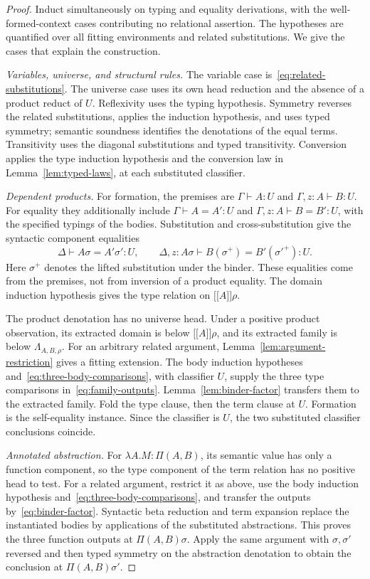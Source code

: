 \documentclass[11pt,a4paper]{article}
\theoremstyle{definition}
\theoremstyle{remark}
\newcommand{\ev}[1]{\mathopen{[\![}#1\mathclose{]\!]}}
\begin{document}
\begin{proof}
Induct simultaneously on typing and equality derivations, with the
well-formed-context cases contributing no relational assertion.
The hypotheses are quantified over all fitting environments and related
substitutions. We give the cases that explain the construction.

\smallskip\noindent\emph{Variables, universe, and structural rules.}
The variable case is~\eqref{eq:related-substitutions}. The universe case
uses its own head reduction and the absence of a product reduct of $U$.
Reflexivity uses the typing hypothesis. Symmetry reverses the related
substitutions, applies the induction hypothesis, and uses typed symmetry;
semantic soundness identifies the denotations of the equal terms.
Transitivity uses the diagonal substitutions and typed transitivity.
Conversion applies the type induction hypothesis and the conversion law
in Lemma~\ref{lem:typed-laws}, at each substituted classifier.

\smallskip\noindent\emph{Dependent products.}
For formation, the premises are $\Gamma\vdash A:U$ and
$\Gamma,z:A\vdash B:U$. For equality they additionally include
$\Gamma\vdash A=A':U$ and $\Gamma,z:A\vdash B=B':U$, with the
specified typings of the bodies. Substitution and cross-substitution
give the syntactic component equalities
\[
 \Delta\vdash A\sigma=A'\sigma':U,\qquad
 \Delta,z:A\sigma\vdash B(\sigma^+)=B'(\sigma'^+):U.
\]
Here $\sigma^+$ denotes the lifted substitution under the binder.
These equalities come from the premises, not from inversion of a product
equality. The domain induction hypothesis gives the type relation on
$\ev A\rho$.

The product denotation has no universe head. Under a positive product
observation, its extracted domain is below $\ev A\rho$, and its extracted
family is below $\Lambda_{A,B,\rho}$. For an arbitrary related argument,
Lemma~\ref{lem:argument-restriction} gives a fitting extension. The body
induction hypotheses and~\eqref{eq:three-body-comparisons}, with classifier
$U$, supply the three type comparisons in~\eqref{eq:family-outputs}.
Lemma~\ref{lem:binder-factor} transfers them to the extracted family.
Fold the type clause, then the term clause at $U$. Formation is the
self-equality instance. Since the classifier is $U$, the two substituted
classifier conclusions coincide.

\smallskip\noindent\emph{Annotated abstraction.}
For $\lambda A.M:\Pi(A,B)$, its semantic value has only a function
component, so the type component of the term relation has no positive
head to test. For a related argument, restrict it as above, use the body
induction hypothesis and~\eqref{eq:three-body-comparisons}, and transfer
the outputs by~\eqref{eq:binder-factor}. Syntactic beta reduction and term
expansion replace the instantiated bodies by applications of the
substituted abstractions. This proves the three function outputs at
$\Pi(A,B)\sigma$. Apply the same argument with $\sigma,\sigma'$
reversed and then typed symmetry on the abstraction denotation to obtain
the conclusion at $\Pi(A,B)\sigma'$.


\end{proof}
\end{document}
